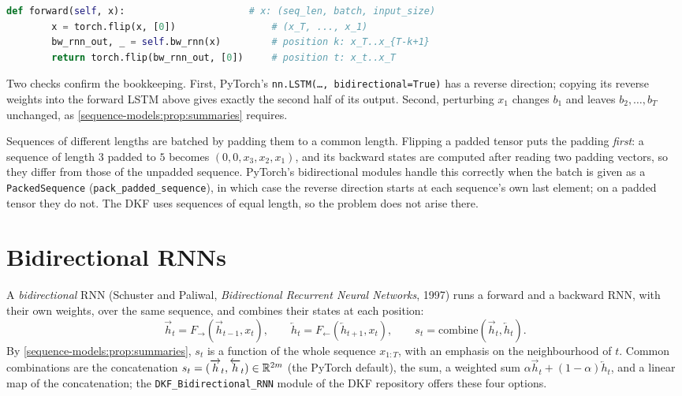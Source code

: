 \begin{notechapter}
\begin{lstlisting}[language=Python]
    def forward(self, x):                      # x: (seq_len, batch, input_size)
        x = torch.flip(x, [0])                 # (x_T, ..., x_1)
        bw_rnn_out, _ = self.bw_rnn(x)         # position k: x_T..x_{T-k+1}
        return torch.flip(bw_rnn_out, [0])     # position t: x_t..x_T
\end{lstlisting}
Two checks confirm the bookkeeping. First, PyTorch's \texttt{nn.LSTM(\ldots, bidirectional=True)} has
a reverse direction; copying its reverse weights into the forward LSTM above gives exactly
the second half of its output. Second, perturbing $x_1$ changes $b_1$ and leaves $b_2,\dots,b_T$ unchanged,
as \cref{sequence-models:prop:summaries} requires.

\begin{pitfall}
Sequences of different lengths are batched by padding them to a common length. Flipping a
padded tensor puts the padding \emph{first}: a sequence of length $3$ padded to $5$ becomes
$(0, 0, x_3, x_2, x_1)$, and its backward states are computed after reading two padding vectors, so
they differ from those of the unpadded sequence. PyTorch's bidirectional modules handle this
correctly when the batch is given as a \texttt{PackedSequence} (\texttt{pack\_padded\_sequence}), in
which case the reverse direction starts at each sequence's own last element; on a padded
tensor they do not. The DKF uses sequences of equal length, so the problem does not arise
there.
\end{pitfall}

\section{Bidirectional RNNs}\label{sequence-models:sec:bidirectional}

A \emph{bidirectional} RNN (Schuster and Paliwal, \emph{Bidirectional Recurrent
Neural Networks}, 1997) runs a forward and a backward RNN, with their
own weights, over the same sequence, and combines their states at each position:
\[
  \overrightarrow h_t = F_{\to}(\overrightarrow h_{t-1}, x_t),\qquad
  \overleftarrow h_t = F_{\leftarrow}(\overleftarrow h_{t+1}, x_t),\qquad
  s_t = \mathrm{combine}(\overrightarrow h_t, \overleftarrow h_t) .
\]
By \cref{sequence-models:prop:summaries}, $s_t$ is a function of the whole sequence $x_{1:T}$, with an emphasis on the
neighbourhood of $t$. Common combinations are the concatenation $s_t = (\overrightarrow h_t, \overleftarrow h_t)\in\mathbb{R}^{2m}$ (the PyTorch
default), the sum, a weighted sum $\alpha\overrightarrow h_t + (1 - \alpha)\overleftarrow h_t$, and a linear map of the concatenation;
the \texttt{DKF\_Bidirectional\_RNN} module of the DKF repository offers these four options.


\end{notechapter}
